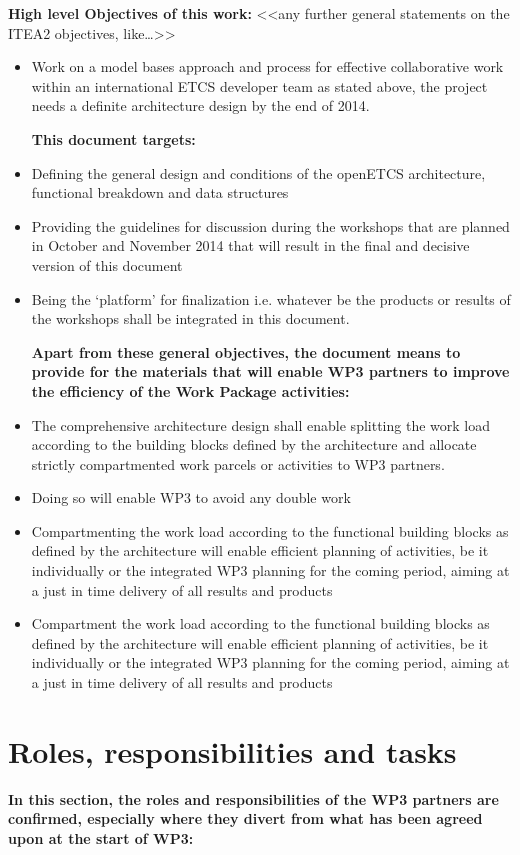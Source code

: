 \textbf{High level Objectives of this work:}
<<any further general statements on the ITEA2  objectives, like…>>\\

\begin{itemize}
\item Work on a model bases approach and process for effective collaborative work within an international ETCS developer team as stated above, the project needs a definite architecture design by the end of 2014.

\textbf{This document targets:}
\item Defining the general design and conditions of the openETCS architecture, functional breakdown and data structures
\item Providing the guidelines for discussion during the workshops that are planned in October and November 2014 that will result in the final and decisive version of this document
\item Being the ‘platform’ for finalization i.e. whatever be the products or results of the workshops shall be integrated in this document.

\textbf{Apart from these general objectives, the document means to provide for the materials that will enable WP3 partners to improve the efficiency of the Work Package activities:}
\item The comprehensive architecture design shall enable splitting the work load according to the building blocks defined by the architecture and allocate strictly compartmented work parcels or activities to WP3 partners.
\item Doing so will enable WP3 to avoid any double work
\item  Compartmenting the work load according to the functional building blocks as defined by the architecture will enable efficient planning of activities, be it individually or the integrated WP3 planning for the coming period, aiming at a just in time delivery of all results and products
\item  Compartment the work load according to the functional building blocks as defined by the architecture will enable efficient planning of activities, be it individually or the integrated WP3 planning for the coming period, aiming at a just in time delivery of all results and products
\end{itemize}

\section{Roles, responsibilities and tasks}
\textbf{In this section, the roles and responsibilities of the WP3 partners are confirmed, especially where they divert from what has been agreed upon at the start of WP3:}

